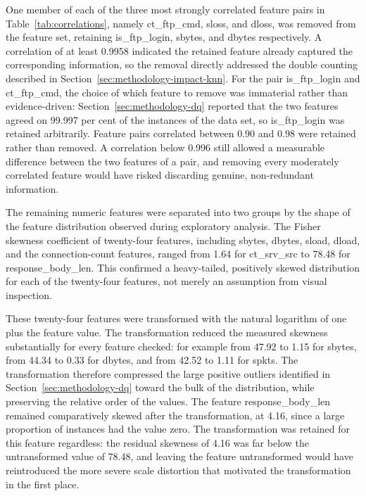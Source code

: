 \documentclass[10pt,conference]{IEEEtran}
\begin{document}
One member of each of the three most strongly correlated feature pairs in Table~\ref{tab:correlations}, namely ct\_ftp\_cmd, sloss, and dloss, was removed from the feature set, retaining is\_ftp\_login, sbytes, and dbytes respectively. A correlation of at least 0.9958 indicated the retained feature already captured the corresponding information, so the removal directly addressed the double counting described in Section~\ref{sec:methodology-impact-knn}. For the pair is\_ftp\_login and ct\_ftp\_cmd, the choice of which feature to remove was immaterial rather than evidence-driven: Section~\ref{sec:methodology-dq} reported that the two features agreed on 99.997 per cent of the instances of the data set, so is\_ftp\_login was retained arbitrarily. Feature pairs correlated between 0.90 and 0.98 were retained rather than removed. A correlation below 0.996 still allowed a measurable difference between the two features of a pair, and removing every moderately correlated feature would have risked discarding genuine, non-redundant information.

The remaining numeric features were separated into two groups by the shape of the feature distribution observed during exploratory analysis. The Fisher skewness coefficient of twenty-four features, including sbytes, dbytes, sload, dload, and the connection-count features, ranged from 1.64 for ct\_srv\_src to 78.48 for response\_body\_len. This confirmed a heavy-tailed, positively skewed distribution for each of the twenty-four features, not merely an assumption from visual inspection.

These twenty-four features were transformed with the natural logarithm of one plus the feature value. The transformation reduced the measured skewness substantially for every feature checked: for example from 47.92 to 1.15 for sbytes, from 44.34 to 0.33 for dbytes, and from 42.52 to 1.11 for spkts. The transformation therefore compressed the large positive outliers identified in Section~\ref{sec:methodology-dq} toward the bulk of the distribution, while preserving the relative order of the values. The feature response\_body\_len remained comparatively skewed after the transformation, at 4.16, since a large proportion of instances had the value zero. The transformation was retained for this feature regardless: the residual skewness of 4.16 was far below the untransformed value of 78.48, and leaving the feature untransformed would have reintroduced the more severe scale distortion that motivated the transformation in the first place.
\end{document}
